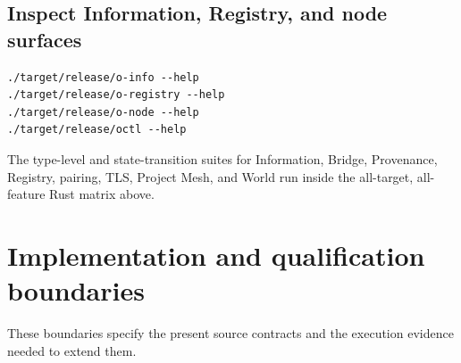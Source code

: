 \documentclass[11pt,oneside]{article}
\begin{document}
\subsection{Inspect Information, Registry, and node surfaces}

\begin{lstlisting}[style=plaincode]
./target/release/o-info --help
./target/release/o-registry --help
./target/release/o-node --help
./target/release/octl --help
\end{lstlisting}

The type-level and state-transition suites for Information, Bridge,
Provenance, Registry, pairing, TLS, Project Mesh, and World run inside the
all-target, all-feature Rust matrix above.


\section{Implementation and qualification boundaries}
\label{sec:boundaries}

These boundaries specify the present source contracts and the execution
evidence needed to extend them.
\end{document}
